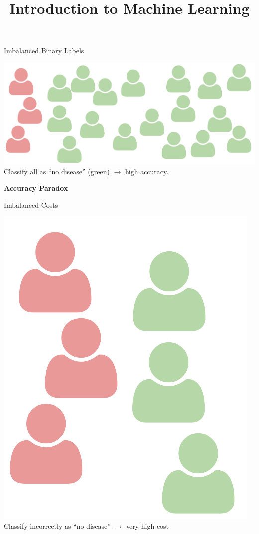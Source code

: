 \documentclass[11pt,compress,t,notes=noshow, xcolor=table]{beamer}
\title{Introduction to Machine Learning}
\institute{\href{https://compstat-lmu.github.io/lecture_i2ml/}{compstat-lmu.github.io/lecture\_i2ml}}
\date{}
\begin{document}










\begin{vbframe}{Imbalanced Binary Labels}

\begin{center}
\includegraphics[width=.9\textwidth]{figure_man/imbalanced.pdf}\\
Classify all as \enquote{no disease} (green) $\rightarrow$ high accuracy.

\lz

\textbf{Accuracy Paradox}
\end{center}

\end{vbframe}


\begin{vbframe}{Imbalanced Costs}

\begin{center}
\includegraphics[width=.3\textwidth]{figure_man/imbalanced-costs.pdf}\\
Classify incorrectly as \enquote{no disease} $\rightarrow$ very high cost

\end{center}

\end{vbframe}
\end{document}
